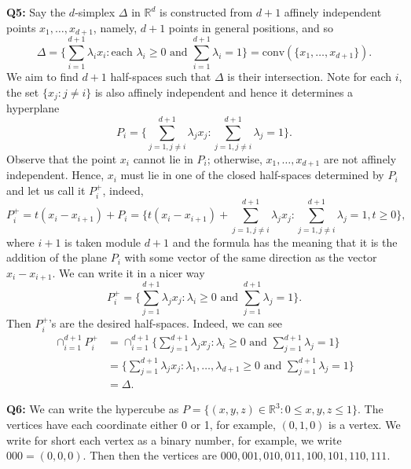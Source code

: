 \documentclass[12pt,reqno]{amsart}
\theoremstyle{definition}
\newcommand{\RR}{\mathbb{R}}
\newcommand{\conv}[1]{\mathrm{conv}(#1)}
\begin{document}
\noindent \textbf{Q5:} Say the $d$-simplex $\Delta$ in $\RR^d$ is constructed from $d+1$ affinely independent points $x_1,\dots,x_{d+1}$, namely, $d+1$ points in general positions, and so $$\Delta=\{\sum_{i=1}^{d+1} \lambda_i x_i: \mbox{each }  \lambda_i\geq 0 \mbox{ and } \sum_{i=1}^{d+1}\lambda_i=1\} =\conv{\{x_1,\dots,x_{d+1}\}}.$$ We aim to find $d+1$ half-spaces such that $\Delta$ is their intersection. Note for each $i$, the set $\{x_j: j\not= i\}$ is also affinely independent and hence it determines a hyperplane $$P_i=\{\sum_{j=1, j\not=i}^{d+1} \lambda_j x_j: \sum_{j=1, j\not=i}^{d+1}\lambda_j=1\}.$$ Observe that the point $x_i$ cannot lie in $P_i$; otherwise, $x_1,\dots,x_{d+1}$ are not affinely independent. Hence, $x_i$ must lie in one of the closed half-spaces determined by $P_i$ and let us call it $P_i^{+}$, indeed, $$P_i^+=t(x_i-x_{i+1}) + P_i=\{t(x_i - x_{i+1})+\sum_{j=1, j\not=i}^{d+1} \lambda_j x_j: \sum_{j=1, j\not=i}^{d+1}\lambda_j=1, t\geq 0\},$$ where $i+1$ is taken module $d+1$ and the formula has the meaning that it is the addition of the plane $P_i$ with some vector of the same direction as the vector  $x_i -x_{i+1}$. We can write it in a nicer way $$P_i^+ =\{  \sum_{j=1}^{d+1} \lambda_j x_j: \lambda_i\geq 0 \mbox{ and } \sum_{j=1}^{d+1}\lambda_j=1 \}.$$ Then $P_i^+$'s are the desired half-spaces. Indeed, we can see \begin{align*}
  \cap_{i=1}^{d+1} P_i^+ & = \cap_{i=1}^{d+1} \{  \sum_{j=1}^{d+1} \lambda_j x_j: \lambda_i\geq 0 \mbox{ and } \sum_{j=1}^{d+1}\lambda_j=1    \} \\
                         & =\{\sum_{j=1}^{d+1} \lambda_j x_j: \lambda_1,\dots,\lambda_{d+1}\geq 0 \mbox{ and } \sum_{j=1}^{d+1}\lambda_j=1    \} \\
                         & = \Delta.
\end{align*}



\newpage

\noindent \textbf{Q6:} We can write the hypercube as $P=\{(x,y,z)\in \RR^3: 0\leq x,y,z\leq 1\}$. The vertices have each coordinate either 0 or 1, for example, $(0,1,0)$ is a vertex. We write for short each vertex as a binary number, for example, we write $000=(0,0,0)$. Then then the vertices are $000,001,010,011,100,101,110,111$.
\end{document}
